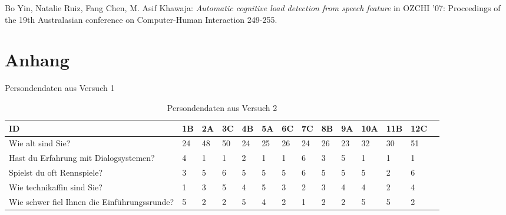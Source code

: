 \documentclass[12pt,a4paper]{scrartcl}
\begin{document}
\begin{appendix}
\begin{thebibliography}{Maron \& Ames, 1982}
 Bo Yin, Natalie Ruiz, Fang Chen, M. Asif Khawaja: \textit{Automatic cognitive load detection from speech feature} in OZCHI ’07: Proceedings of the 19th Australasian conference on Computer-Human Interaction 249-255. 






\end{thebibliography}
\newpage




\listoffigures
\cleardoublepage

\listoftables
\cleardoublepage

\section{Anhang}

\begin{table}
\caption{Persondendaten aus Versuch 1} \label{Persondendaten aus Versuch 1}

\smallskip
\begin{tabular}{|p{6cm}| p{0.6cm} | p{0.6cm} | p{0.6cm} | p{0.6cm} | p{0.6cm} | p{0.6cm} | p{0.6cm} | p{0.6cm} | p{0.6cm} | p{0.6cm} | p{0.6cm} | p{0.6cm} | p{} | }
\hline

	ID & 1B & 2A & 3C & 4B & 5A & 6C & 7C & 8B & 9A & 10A & 11B & 12C \\ \hline \hline
	Wie alt sind Sie? & 24 & 48 & 50 & 24 & 25 & 26 & 24 & 26 & 23 & 32 & 30 & 51 \\ \hline
	Hast du Erfahrung mit Dialogsystemen? & 4 & 1 & 1 & 2 & 1 & 1 & 6 & 3 & 5 & 1 & 1 & 1 \\ \hline
	Spielst du oft Rennspiele? & 3 & 5 & 6 & 5 & 5 & 5 & 6 & 5 & 5 & 5 & 2 & 6 \\ \hline
	Wie technikaffin sind Sie? & 1 & 3 & 5 & 4 & 5 & 3 & 2 & 3 & 4 & 4 & 2 & 4 \\ \hline
	Wie schwer fiel Ihnen die Einführungssrunde? & 5 & 2 & 2 & 5 & 4 & 2 & 1 & 2 & 2 & 5 & 5 & 2 \\ \hline
\end{tabular}

\bigskip\bigskip  %
\caption{Persondendaten aus Versuch 2} \label{Persondendaten aus Versuch 2}


\end{table}
\end{appendix}
\end{document}
